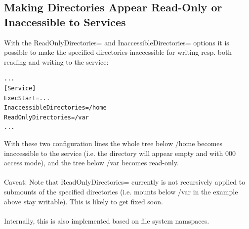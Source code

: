 \documentclass[titlepage]{article}
\begin{document}
\subsection{Making Directories Appear Read-Only or Inaccessible to Services}
With the ReadOnlyDirectories= and InaccessibleDirectories= options it is possible to make the specified directories inaccessible for writing resp. both reading and writing to the service:
\begin{lstlisting}
...
[Service]
ExecStart=...
InaccessibleDirectories=/home
ReadOnlyDirectories=/var
...

\end{lstlisting}
With these two configuration lines the whole tree below /home becomes inaccessible to the service (i.e. the directory will appear empty and with 000 access mode), and the tree below /var becomes read-only.
\\
\\
Caveat: Note that ReadOnlyDirectories= currently is not recursively applied to submounts of the specified directories (i.e. mounts below /var in the example above stay writable). This is likely to get fixed soon.
\\
\\
Internally, this is also implemented based on file system namspaces.
\end{document}
